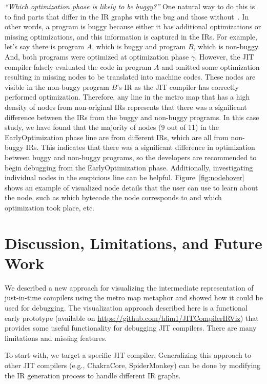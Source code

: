 \documentclass[runningheads]{llncs}
\begin{document}
\textit{``Which optimization phase is likely to be buggy?”} One natural way to do this is to find parts that differ in the IR graphs with the bug and those without~\cite{DBLP:conf/vee/LimD21}. In other words, a program is  buggy  because either it has additional optimizations or missing optimizations, and this information is captured in the IRs. For example, let's say there is program $A$, which is buggy and program $B$, which is non-buggy. And, both programs were optimized at optimization phase $\gamma$. However, the JIT compiler falsely evaluated the code in program $A$ and omitted some optimization resulting in missing nodes to be translated into machine codes. These nodes are visible in the non-buggy program $B$'s IR as the JIT compiler has correctly performed optimization. Therefore, any line in the metro map that has a high density of nodes from non-original IRs represents that there was a significant difference between the IRs from the buggy and non-buggy programs. In this case study, we have found that the majority of nodes (9 out of 11) in the EarlyOptimization phase line are from different IRs, which are all from non-buggy IRs. This indicates that there was a significant difference in optimization between buggy and non-buggy programs, so the developers are recommended to begin debugging from the EarlyOptimization phase. Additionally, investigating individual nodes in the suspicious line can be helpful. Figure~\ref{fig:nodehover} shows an example of visualized node details that the user can use to learn about the node, such as which bytecode the node corresponds to and  which optimization took place, etc.

\section{Discussion, Limitations, and Future Work}\label{sec:future-work}

We described a new approach for visualizing the intermediate representation of just-in-time compilers using the metro map metaphor and showed how it could be used for debugging. The visualization approach described here is a functional early prototype (available on \url{https://github.com/hlim1/JITCompilerIRViz}) that provides some useful functionality for debugging JIT compilers. There are many limitations and missing features. 

To start with, we target a specific JIT compiler. Generalizing this approach to other JIT compilers (e.g., ChakraCore, SpiderMonkey) can be done by modifying the IR generation process to handle different IR graphs.
\end{document}
